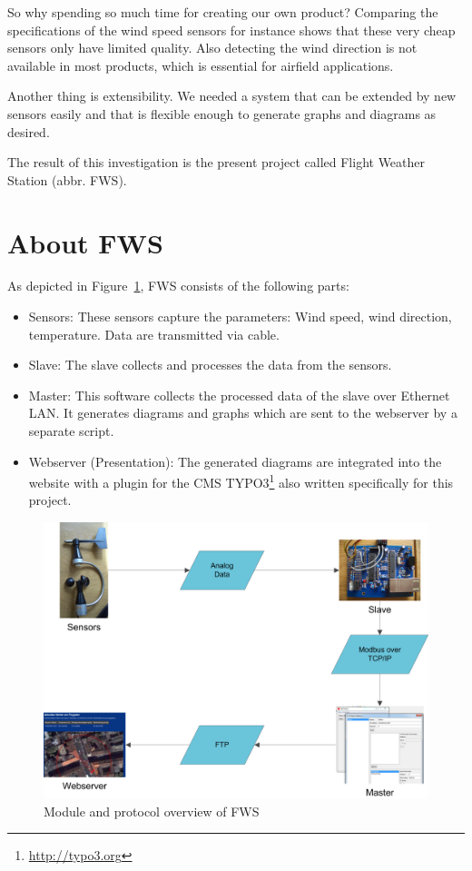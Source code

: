 So why spending so much time for creating our own product? Comparing the specifications of the wind speed sensors for instance shows that these very cheap sensors only have limited quality. Also detecting the wind direction is not available in most products, which is essential for airfield applications.

Another thing is extensibility. We needed a system that can be extended by new sensors easily and that is flexible enough to generate graphs and diagrams as desired.

The result of this investigation is the present project called Flight Weather Station (abbr. FWS).

\section{About FWS} %
\label{sec:about_fws}

As depicted in Figure~\ref{fig:fws_overview}, FWS consists of the following parts:
\begin{itemize}
\item Sensors: These sensors capture the parameters: Wind speed, wind direction, temperature. Data are transmitted via cable.
\item Slave: The slave collects and processes the data from the sensors.
\item Master: This software collects the processed data of the slave over Ethernet LAN. It generates diagrams and graphs which are sent to the webserver by a separate script.
\item Webserver (Presentation): The generated diagrams are integrated into the website with a plugin for the CMS TYPO3\footnote{\url{http://typo3.org}} also written specifically for this project.
\end{itemize}

\begin{figure}[ht]
    \centering
    \includegraphics[width=\linewidth]{graphics/overview.png}
    \caption{Module and protocol overview of FWS}
    \label{fig:fws_overview}
\end{figure}

